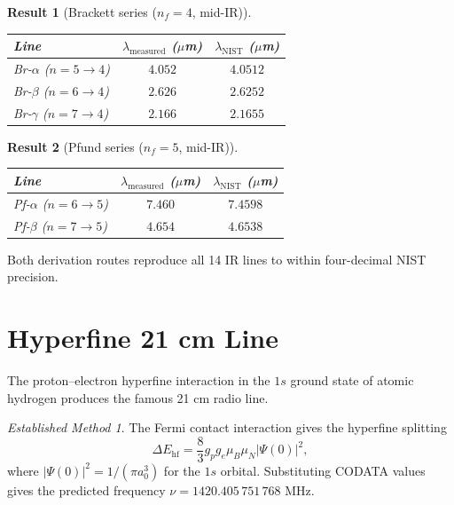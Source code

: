 \documentclass[11pt,a4paper]{article}
\theoremstyle{stmtstyle}
\newtheorem{result}{Result}
\theoremstyle{definition}
\theoremstyle{remark}
\newtheorem*{established}{Established Method}
\begin{document}
\begin{result}[Brackett series ($n_{f}=4$, mid-IR)]\label{res:brackett}
\begin{center}\small
\begin{tabular}{lcc}
\toprule
Line & $\lambda_{\mathrm{measured}}$ ($\mu$m) & $\lambda_{\mathrm{NIST}}$ ($\mu$m)\\
\midrule
Br-$\alpha$ ($n=5\to 4$) & $4.052$ & $4.0512$\\
Br-$\beta$ ($n=6\to 4$)  & $2.626$ & $2.6252$\\
Br-$\gamma$ ($n=7\to 4$) & $2.166$ & $2.1655$\\
\bottomrule
\end{tabular}
\end{center}
\end{result}

\begin{result}[Pfund series ($n_{f}=5$, mid-IR)]\label{res:pfund}
\begin{center}\small
\begin{tabular}{lcc}
\toprule
Line & $\lambda_{\mathrm{measured}}$ ($\mu$m) & $\lambda_{\mathrm{NIST}}$ ($\mu$m)\\
\midrule
Pf-$\alpha$ ($n=6\to 5$) & $7.460$ & $7.4598$\\
Pf-$\beta$ ($n=7\to 5$)  & $4.654$ & $4.6538$\\
\bottomrule
\end{tabular}
\end{center}
\end{result}

Both derivation routes reproduce all 14 IR lines to within four-decimal NIST precision.

\section{Hyperfine 21 cm Line}
\label{sec:hhyperfine}

The proton--electron hyperfine interaction in the $1s$ ground state of atomic hydrogen produces the famous 21 cm radio line.

\begin{established}
The Fermi contact interaction gives the hyperfine splitting
\begin{equation}
\Delta E_{\mathrm{hf}} = \frac{8}{3} g_{p} g_{e} \mu_{B} \mu_{N} |\Psi(0)|^{2},
\end{equation}
where $|\Psi(0)|^{2} = 1/(\pi a_{0}^{3})$ for the $1s$ orbital. Substituting CODATA values \citep{codata2022,karshenboim2005} gives the predicted frequency $\nu = 1420.405\,751\,768$ MHz.
\end{established}
\end{document}
